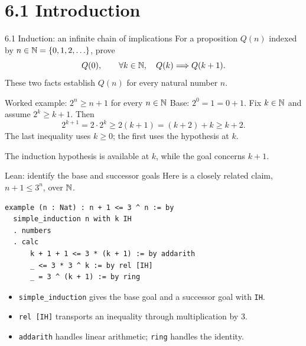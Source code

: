 

\begin{frame}
  \titlepage
\end{frame}


\section{6.1 Introduction}
\begin{frame}{6.1 Induction: an infinite chain of implications}
For a proposition $Q(n)$ indexed by $n\in\mathbb{N}=\{0,1,2,\ldots\}$, prove
\[
 Q(0),\qquad \forall k\in\mathbb{N},\quad Q(k)\Longrightarrow Q(k+1).
\]
These two facts establish $Q(n)$ for every natural number $n$.
\begin{block}{Worked example: $2^n\ge n+1$ for every $n\in\mathbb{N}$}
Base: $2^0=1=0+1$. Fix $k\in\mathbb{N}$ and assume $2^k\ge k+1$.
Then
\[
 2^{k+1}=2\cdot2^k\ge2(k+1)=(k+2)+k\ge k+2.
\]
The last inequality uses $k\ge0$; the first uses the hypothesis at $k$.
\end{block}
The induction hypothesis is available at $k$, while the goal concerns $k+1$.
\end{frame}

\begin{frame}[fragile]{Lean: identify the base and successor goals}
Here is a closely related claim, $n+1\le3^n$, over $\mathbb{N}$.
\begin{lstlisting}
example (n : Nat) : n + 1 <= 3 ^ n := by
  simple_induction n with k IH
  . numbers
  . calc
      k + 1 + 1 <= 3 * (k + 1) := by addarith
      _ <= 3 * 3 ^ k := by rel [IH]
      _ = 3 ^ (k + 1) := by ring
\end{lstlisting}
\begin{itemize}
\item \texttt{simple\_induction} gives the base goal and a successor goal with \texttt{IH}.
\item \texttt{rel [IH]} transports an inequality through multiplication by $3$.
\item \texttt{addarith} handles linear arithmetic; \texttt{ring} handles the identity.
\end{itemize}
\end{frame}

